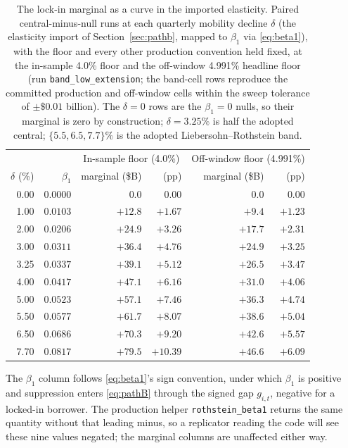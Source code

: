 \begin{table}[!t]
\centering
\caption{The lock-in marginal as a curve in the imported elasticity. Paired central-minus-null runs at each quarterly mobility decline $\delta$ (the elasticity import of Section~\ref{sec:pathb}, mapped to $\beta_1$ via \eqref{eq:beta1}), with the floor and every other production convention held fixed, at the in-sample 4.0\% floor and the off-window 4.991\% headline floor (run \texttt{band\_low\_extension}; the band-cell rows reproduce the committed production and off-window cells within the sweep tolerance of $\pm\$0.01$ billion). The $\delta = 0$ rows are the $\beta_1 = 0$ nulls, so their marginal is zero by construction; $\delta = 3.25\%$ is half the adopted central; $\{5.5, 6.5, 7.7\}\%$ is the adopted Liebersohn--Rothstein band.}
\label{tab:lowband}
\footnotesize
\begin{threeparttable}
\begin{tabular}{@{}rrrrrr@{}}
\toprule
& & \multicolumn{2}{c}{In-sample floor (4.0\%)} & \multicolumn{2}{c}{Off-window floor (4.991\%)} \\
\cmidrule(lr){3-4}\cmidrule(lr){5-6}
$\delta$ (\%) & $\beta_1$ & marginal (\$B) & (pp) & marginal (\$B) & (pp) \\
\midrule
0.00 & $0.0000$ & $0.0$ & $0.00$ & $0.0$ & $0.00$ \\
1.00 & $0.0103$ & $+12.8$ & $+1.67$ & $+9.4$ & $+1.23$ \\
2.00 & $0.0206$ & $+24.9$ & $+3.26$ & $+17.7$ & $+2.31$ \\
3.00 & $0.0311$ & $+36.4$ & $+4.76$ & $+24.9$ & $+3.25$ \\
3.25 & $0.0337$ & $+39.1$ & $+5.12$ & $+26.5$ & $+3.47$ \\
4.00 & $0.0417$ & $+47.1$ & $+6.16$ & $+31.0$ & $+4.06$ \\
5.00 & $0.0523$ & $+57.1$ & $+7.46$ & $+36.3$ & $+4.74$ \\
5.50 & $0.0577$ & $+61.7$ & $+8.07$ & $+38.6$ & $+5.04$ \\
6.50 & $0.0686$ & $+70.3$ & $+9.20$ & $+42.6$ & $+5.57$ \\
7.70 & $0.0817$ & $+79.5$ & $+10.39$ & $+46.6$ & $+6.09$ \\
\bottomrule
\end{tabular}
\begin{tablenotes}[flushleft]\footnotesize
\item The $\beta_1$ column follows \eqref{eq:beta1}'s sign convention, under which $\beta_1$ is positive and suppression enters \eqref{eq:pathB} through the signed gap $g_{i,t}$, negative for a locked-in borrower. The production helper \texttt{rothstein\_beta1} returns the same quantity without that leading minus, so a replicator reading the code will see these nine values negated; the marginal columns are unaffected either way.
\end{tablenotes}
\end{threeparttable}
\end{table}

